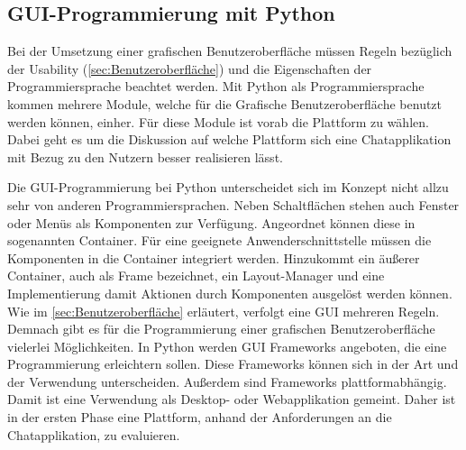 \documentclass[a4paper,titlepage,halfparskip,12pt]{scrreprt}
\begin{document}
\begin{onehalfspacing}
\pagebreak
\subsection{GUI-Programmierung mit Python}
\label{subsec:GuiPython}
Bei der Umsetzung einer grafischen Benutzeroberfläche müssen Regeln bezüglich der Usability (\autoref{sec:Benutzeroberfläche}) und die Eigenschaften der Programmiersprache beachtet werden. Mit Python als Programmiersprache kommen mehrere Module, welche für die Grafische Benutzeroberfläche benutzt werden können, einher. Für diese Module ist vorab die Plattform zu wählen. Dabei geht es um die Diskussion auf welche Plattform sich eine Chatapplikation mit Bezug zu den Nutzern besser realisieren lässt.

Die \ac{GUI}-Programmierung bei Python unterscheidet sich im Konzept nicht allzu sehr von anderen Programmiersprachen. Neben Schaltflächen stehen auch Fenster oder Menüs als Komponenten zur Verfügung. Angeordnet können diese in sogenannten Container. Für eine geeignete Anwenderschnittstelle müssen die Komponenten in die Container integriert werden. Hinzukommt ein äußerer Container, auch als Frame bezeichnet, ein Layout-Manager und eine Implementierung damit Aktionen durch Komponenten ausgelöst werden können. Wie im \autoref{sec:Benutzeroberfläche} erläutert, verfolgt eine \ac{GUI} mehreren Regeln. Demnach gibt es für die Programmierung einer grafischen Benutzeroberfläche vielerlei Möglichkeiten. In Python werden \ac{GUI} Frameworks angeboten, die eine Programmierung erleichtern sollen. Diese Frameworks können sich in der Art und der Verwendung unterscheiden. Außerdem sind Frameworks plattformabhängig. Damit ist eine Verwendung als Desktop- oder Webapplikation gemeint. Daher ist in der ersten Phase eine Plattform, anhand der Anforderungen an die Chatapplikation, zu evaluieren.\cite{Steyer2018} \\

\end{onehalfspacing}
\end{document}
